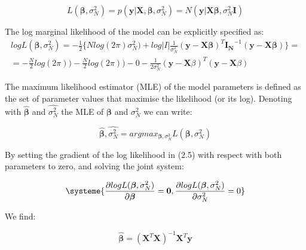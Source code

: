 \begin{equation} \label{eq4:Linear_regression_likelihood}
 L(\boldsymbol{\beta}, \sigma_N^2) = p(\mathbf{y}| \mathbf{X}, \boldsymbol{\beta}, \sigma_N^2) = N(\mathbf{y} | \mathbf{X}\boldsymbol{\beta}, \sigma_N^2 \mathbf{I}) 
\end{equation}

The log marginal likelihood of the model can be explicitly specified as:\\

\begin{equation} \label{eq5:Linear_regression_log_likelihood}
\begin{split}
logL(\boldsymbol{\beta}, \sigma_N^2) = -\frac{1}{2} \bigg\{Nlog(2\pi)\sigma_N^2) + log|I| \frac{1}{\sigma_N^2}(\mathbf{y}-\mathbf{X}\boldsymbol{\beta})^T\mathbf{I_N}^{-1}(\mathbf{y}-\mathbf{X}\boldsymbol{\beta}) \bigg\}  = \\
= -\frac{N}{2}log(2\pi)) - \frac{N}{2}log(2\pi))- 0 - \frac{1}{2\sigma_N^2}(\mathbf{y}-\mathbf{X}\beta)^T(\mathbf{y}-\mathbf{X}\beta)  
\end{split}
\end{equation}

The maximum likelihood estimator (MLE) of the model parameters is defined as the set of parameter values that maximise the likelihood (or its log). Denoting with $\hat{\boldsymbol{\beta}}$ and $\hat{\sigma_N^2}$ the MLE of $\boldsymbol{\beta}$ and $\sigma_N^2$ we can write:

\begin{equation} \label{eq6:Linear_regression_MLEs}
\hat{\boldsymbol{\beta}},\hat{\sigma_N^2} = argmax_{\boldsymbol{\beta},\sigma_N^2}L(\boldsymbol{\beta}, \sigma_N^2) 
\end{equation} 

By setting the gradient of the log likelihood in (2.5) with respect with both parameters to zero, and solving the joint system:

\begin{equation} \label{eq7:Linear_regression_MLE_system}
\systeme{
    \dfrac{\partial logL(\boldsymbol{\beta}, \sigma_N^2)}{\partial \boldsymbol{\beta}} = \mathbf{0},
    \dfrac{\partial logL(\boldsymbol{\beta}, \sigma_N^2)}{\partial \sigma_N^2} = 0
    }
\end{equation}

We find:

\begin{equation} \label{eq8:Linear_regression_MLE_solution_beta}
\hat{\boldsymbol{\beta}} = (\mathbf{X}^T\mathbf{X})^{-1}\mathbf{X}^T\mathbf{y} 
\end{equation}

